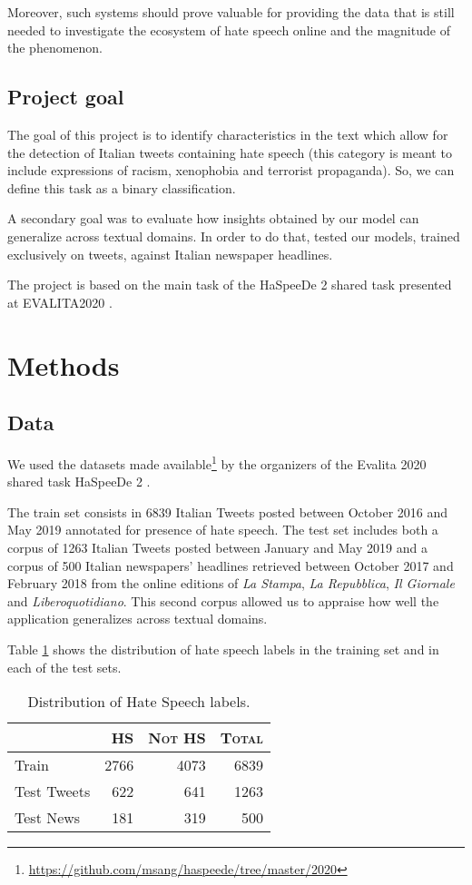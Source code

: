 \documentclass[a4paper, 9pt, twocolumn, DIV=calc]{scrartcl}
\begin{document}
Moreover, such systems should prove valuable for providing the data that is still needed to investigate the ecosystem of hate speech online and the magnitude of the phenomenon.
\subsection{Project goal}
The goal of this project is to identify characteristics in the text which allow for the detection of Italian tweets containing hate speech (this category is meant to include expressions of racism, xenophobia and terrorist propaganda).
So, we can define this task as a binary classification.

A secondary goal was to evaluate how insights obtained by our model can generalize across textual domains. In order to do that, tested our models, trained exclusively on tweets, against Italian newspaper headlines.

The project is based on the main task of the HaSpeeDe 2 shared task presented at EVALITA2020 \cite{haspeede2}.

\section{Methods}
\subsection{Data}
We used the datasets made available\footnote{\url{https://github.com/msang/haspeede/tree/master/2020}} by the organizers of the Evalita 2020 shared task HaSpeeDe 2 \cite{haspeede2}.

The train set consists in 6839 Italian Tweets posted between October 2016 and May 2019 annotated for presence of hate speech.
The test set includes both a corpus of 1263 Italian Tweets posted between January and May 2019 and a corpus of 500 Italian newspapers' headlines retrieved between October 2017 and February 2018 from the online editions of \emph{La Stampa}, \emph{La Repubblica}, \emph{Il Giornale} and \emph{Liberoquotidiano}.
This second corpus allowed us to appraise how well the application generalizes across textual domains.

Table \ref{tbl:class_composition} shows the distribution of hate speech labels in the training set and in each of the test sets.

\begin{table}
\centering
    \begin{tabular}{lrrr}
        \toprule
        & \textsc{HS} & \textsc{Not HS} & \textsc{Total} \\
        \midrule
        Train & 2766 & 4073 & 6839 \\
        \midrule
        Test Tweets & 622 & 641 & 1263 \\
        Test News & 181 & 319 & 500 \\
        \bottomrule
    \end{tabular}
    \caption{Distribution of Hate Speech labels.}
    \label{tbl:class_composition}
\end{table}
\end{document}

